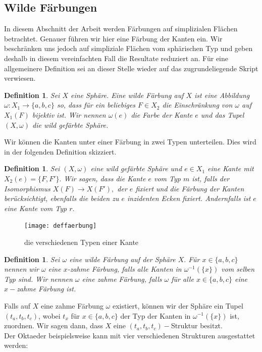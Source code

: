 \documentclass[12pt,titlepage,twoside,cleardoublepage]{article}
\theoremstyle{nummermitklammern}
\newtheorem{definition}[temp]{Definition}
\newtheorem{definition}[zahl]{Definition}
\numberwithin{equation}{section}
\begin{document}
\subsection{Wilde Färbungen}
In diesem Abschnitt der Arbeit werden Färbungen auf simplizialen Flächen betrachtet. Genauer führen wir hier eine Färbung der Kanten ein. Wir beschränken uns jedoch auf simpliziale Flächen vom sphärischen Typ und geben deshalb in diesem vereinfachten Fall die Resultate reduziert an. Für eine allgemeinere Definition sei an dieser Stelle wieder auf das zugrundeliegende Skript verwiesen.
\begin{definition}
Sei $X$ eine Sphäre. Eine \emph{wilde Färbung} auf $X$ ist eine Abbildung $\omega:X_1\to \{a,b,c\}$ so, dass für ein beliebiges $F\in X_2$ die Einschränkung von $\omega$ auf $X_1(F)$ bijektiv ist. Wir nennen $\omega(e)$ die \emph{Farbe} der Kante $e$ und das Tupel $(X,\omega)$ die \emph{wild gefärbte Sphäre}. 
\end{definition}
Wir können die Kanten unter einer Färbung in zwei Typen unterteilen. Dies wird in der folgenden Definition skizziert.
\begin{definition}
Sei $(X,\omega)$ eine wild gefärbte Sphäre und $e\in X_1$ eine Kante mit $X_2(e)=\{F,F'\}.$ Wir sagen, dass die Kante $e$ vom Typ $m$ ist, falls der Isomorphismus $X(F)\to X(F'),$ der $e$ fixiert und die Färbung der Kanten berücksichtigt, ebenfalls die beiden zu $e$ inzidenten Ecken fixiert. Andernfalls ist $e$ eine Kante vom Typ $r.$
\end{definition}
\begin{figure}[H]
\begin{center}
\texttt{[image: deffaerbung]}
\end{center}
\caption{die verschiedenen Typen einer Kante}
\end{figure}
\begin{definition}
Sei $\omega$ eine wilde Färbung auf der Sphäre $X.$ Für $x\in \{a,b,c\}$ nennen wir $\omega$ eine \emph{$x$-zahme} Färbung, falls  alle Kanten in $\omega^{-1}(\{x\})$ vom selben Typ sind. Wir nennen $\omega$ eine \emph{zahme Färbung}, falls $\omega$ für alle $x\in \{a,b,c\}$ eine $x-$zahme Färbung ist. 
\end{definition}
Falls auf $X$ eine zahme Färbung $\omega$ existiert, können wir der Sphäre ein Tupel $(t_a,t_b,t_c)$, wobei $t_x$ für $x\in \{a,b,c\}$ der Typ der Kanten in $\omega^{-1}(\{x\})$ ist, zuordnen. Wir sagen dann, dass $X$ eine $(t_a,t_b,t_c)-$Struktur besitzt.\\
Der Oktaeder beispielsweise kann mit vier verschiedenen Strukturen ausgestattet werden:
\end{document}
